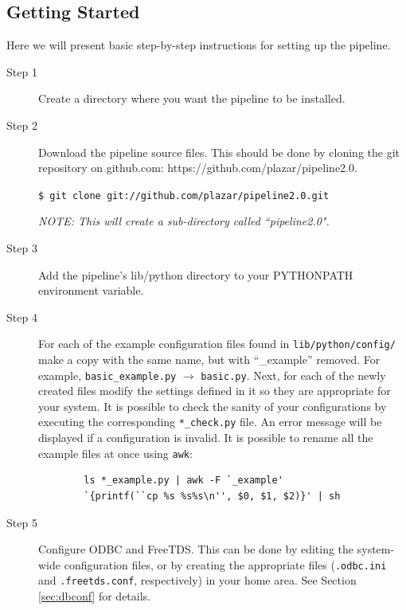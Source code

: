 \documentclass[12pt]{article}
\begin{document}
\subsection{Getting Started}
Here we will present basic step-by-step instructions for setting up the pipeline.

\begin{description}
    \item[Step 1] Create a directory where you want the pipeline to be installed.

    \item[Step 2] Download the pipeline source files. This should be done by cloning the git repository on github.com: https://github.com/plazar/pipeline2.0.

        \smallskip

        \texttt{\$ git clone git://github.com/plazar/pipeline2.0.git}

        \smallskip
        
        \textit{NOTE: This will create a sub-directory called ``pipeline2.0".} 

    \item[Step 3] Add the pipeline's lib/python directory to your PYTHONPATH environment variable. 

    \item[Step 4] For each of the example configuration files found in \texttt{lib/python/config/} make a copy with the same name, but with ``\_example'' removed. For example, \texttt{basic\_example.py} $\rightarrow$ \texttt{basic.py}. Next, for each of the newly created files modify the settings defined in it so they are appropriate for your system. It is possible to check the sanity of your configurations by executing the corresponding \texttt{*\_check.py} file. An error message will be displayed if a configuration is invalid. It is possible to rename all the example files at once using \texttt{awk}:

    \begin{verbatim}
        ls *_example.py | awk -F `_example' 
        `{printf(``cp %s %s%s\n'', $0, $1, $2)}' | sh
    \end{verbatim}

    \item[Step 5] Configure ODBC and FreeTDS. This can be done by editing the system-wide configuration files, or by creating the appropriate files (\texttt{.odbc.ini} and \texttt{.freetds.conf}, respectively) in your home area. See Section \ref{sec:dbconf} for details.


\end{description}
\end{document}
